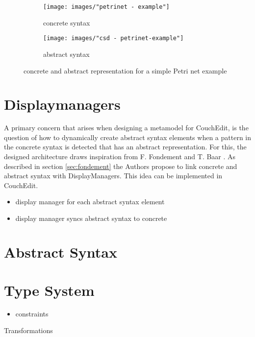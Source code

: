 \begin{figure}[ht!]
  \centering
  \begin{subfigure}[t]{.4\textwidth}
    \centering
    \texttt{[image: images/"petrinet - example"]}
    \caption{concrete syntax}
    \label{subfig:petriconcrete}    
  \end{subfigure}
  \begin{subfigure}[t]{.45\textwidth}
    \centering
    \texttt{[image: images/"csd - petrinet-example"]}
    \caption{abstract syntax}
    \label{subfig:petriabstract}    
  \end{subfigure}
  \caption{concrete and abstract representation for a simple Petri net example}
  \label{fig:petrinets_example}
\end{figure} 



\section{Displaymanagers}
A primary concern that arises when designing a metamodel for CouchEdit, is the question of how to dynamically create abstract syntax elements when a pattern in the concrete syntax is detected that has an abstract representation. For this, the designed architecture draws inspiration from F. Fondement and T. Baar \cite{fondement_making_2005}. As described in section \ref{sec:fondement} the Authors propose to link concrete and abstract syntax with DisplayManagers. This idea can be implemented in CouchEdit.
\begin{itemize}
  \item display manager for each abstract syntax element
  \item display manager syncs abstract syntax to concrete
\end{itemize}


\section{Abstract Syntax}

\section{Type System}
\begin{itemize}
  \item constraints
\end{itemize}

Transformations

